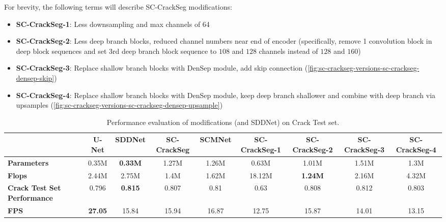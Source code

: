 \documentclass[a4paper,12pt]{report}
\begin{document}
For brevity, the following terms will describe SC-CrackSeg modifications:
\begin{itemize}
    \item \textbf{SC-CrackSeg-1}: Less downsampling and max channels of 64
    \item \textbf{SC-CrackSeg-2}: Less deep branch blocks, reduced channel numbers near end of encoder (specifically, remove 1 convolution block in deep block sequences and set 3rd deep branch block sequence to $108$ and $128$ channels instead of $128$ and $160$)
    \item \textbf{SC-CrackSeg-3}: Replace shallow branch blocks with DenSep module, add skip connection (\autoref{fig:sc-crackseg-versions-sc-crackseg-densep-skip})
    \item \textbf{SC-CrackSeg-4}: Replace shallow branch blocks with DenSep module, keep deep branch shallower and combine with deep branch via upsamples (\autoref{fig:sc-crackseg-versions-sc-crackseg-densep-upsample})
\end{itemize}
\begin{table}[htbp]
    \begin{adjustbox}{width=\columnwidth,center}
        \begin{tabular}{|p{}|c|c|c|c|c|c|c|c|}
            \hline
                                                & \textbf{U-Net} & \textbf{SDDNet} & \textbf{SC-CrackSeg} & \textbf{SCMNet} & \textbf{SC-CrackSeg-1} & \textbf{SC-CrackSeg-2} & \textbf{SC-CrackSeg-3} & \textbf{SC-CrackSeg-4} \\
            \hline
            \textbf{Parameters}                 & 0.35M          & \textbf{0.33M}  & 1.27M                & 1.26M           & 0.63M                  & 1.01M                  & 1.51M                  & 1.3M                   \\
            \hline
            \textbf{Flops}                      & 2.44M          & 2.75M           & 1.4M                 & 1.62M           & 18.12M                 & \textbf{1.24M}         & 2.16M                  & 4.32M                  \\
            \hline
            \textbf{Crack Test Set Performance} & 0.796          & \textbf{0.815}  & 0.807                & 0.81            & 0.63                   & 0.808                  & 0.812                  & 0.803                  \\
            \hline
            \textbf{FPS}                        & \textbf{27.05} & 15.84           & 15.94                & 16.87           & 12.75                  & 15.87                  & 14.01                  & 13.15                  \\
            \hline
        \end{tabular}
    \end{adjustbox}
    \caption{Performance evaluation of modifications (and SDDNet) on Crack Test set.}%
\end{table}
\end{document}
